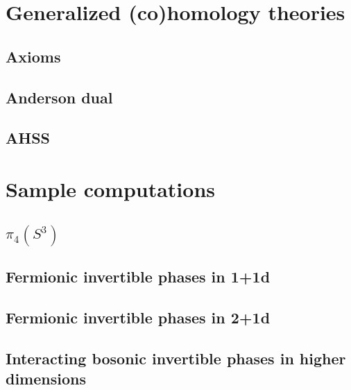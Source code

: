 \documentclass[12pt]{article}
\numberwithin{equation}{section}
\numberwithin{figure}{section}
\theoremstyle{remark}
\begin{document}
\goodbreak

\section{Generalized (co)homology theories}

\subsection{Axioms}

\subsection{Anderson dual}

\subsection{AHSS}

\goodbreak


\section{Sample computations}

\subsection{$\pi_4(S^3)$}

\subsection{Fermionic invertible phases in 1+1d}

\subsection{Fermionic invertible phases in 2+1d}

\subsection{Interacting bosonic invertible phases in higher dimensions}






\end{document}
